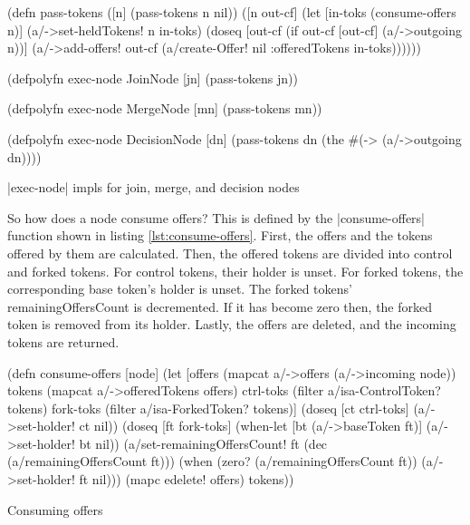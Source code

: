 \documentclass[submission]{eptcs}
\newcommand{\code}{\clojureinline}
\begin{document}
\begin{listing}[h!tb]
\begin{clojurecode}
(defn pass-tokens
  ([n] (pass-tokens n nil))
  ([n out-cf]
   (let [in-toks (consume-offers n)]
     (a/->set-heldTokens! n in-toks)
     (doseq [out-cf (if out-cf [out-cf] (a/->outgoing n))]
       (a/->add-offers!
        out-cf (a/create-Offer!
                nil {:offeredTokens in-toks}))))))

(defpolyfn exec-node JoinNode [jn]
  (pass-tokens jn))

(defpolyfn exec-node MergeNode [mn]
  (pass-tokens mn))

(defpolyfn exec-node DecisionNode [dn]
  (pass-tokens dn (the #(-> %
                       (a/->outgoing dn))))
\end{clojurecode}
\caption{\code|exec-node| impls for join, merge, and decision nodes}
\label{lst:exec-node-join-merge-decision-node}
\end{listing}

So how does a node consume offers?  This is defined by the
\code|consume-offers| function shown in listing \vref{lst:consume-offers}.
First, the offers and the tokens offered by them are calculated.  Then, the
offered tokens are divided into control and forked tokens.  For control tokens,
their holder is unset.  For forked tokens, the corresponding base token's
holder is unset.  The forked tokens' \textsf{remainingOffersCount} is
decremented.  If it has become zero then, the forked token is removed from its
holder.  Lastly, the offers are deleted, and the incoming tokens are returned.

\begin{listing}[h!tb]
\begin{clojurecode}
(defn consume-offers [node]
  (let [offers    (mapcat a/->offers (a/->incoming node))
        tokens    (mapcat a/->offeredTokens offers)
        ctrl-toks (filter a/isa-ControlToken? tokens)
        fork-toks (filter a/isa-ForkedToken? tokens)]
    (doseq [ct ctrl-toks]
      (a/->set-holder! ct nil))
    (doseq [ft fork-toks]
      (when-let [bt (a/->baseToken ft)]
        (a/->set-holder! bt nil))
      (a/set-remainingOffersCount! ft (dec (a/remainingOffersCount ft)))
      (when (zero? (a/remainingOffersCount ft))
        (a/->set-holder! ft nil)))
    (mapc edelete! offers)
    tokens))
\end{clojurecode}
\caption{Consuming offers}
\label{lst:consume-offers}
\end{listing}
\end{document}
